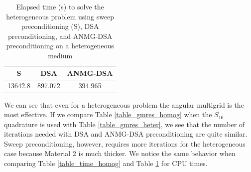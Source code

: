 \begin{table}[H]
  \begin{center}
    \caption{Elapsed time (s) to solve the heterogeneous problem using sweep
    preconditioning (S), DSA preconditioning, and ANMG-DSA preconditioning on
    a heterogeneous medium}
    \begin{tabular}{|c|c|c|}
      \hline
      S & DSA & ANMG-DSA \\
      \hline
      13642.8 & 897.072& 394.965 \\
      \hline
    \end{tabular}
    \label{table_time_heter}
  \end{center}
\end{table}
We can see that even for a heterogeneous problem the angular multigrid is the
most effective. If we compare Table \ref{table_gmres_homog} when the 
  $S_{16}$ quadrature is used with Table \ref{table_gmres_heter}, we see that
the number of iterations needed with DSA and ANMG-DSA preconditioning are
quite similar. Sweep preconditioning, however, requires more iterations for 
the heterogeneous case because Material 2 is much thicker. We notice the same
behavior when comparing Table \ref{table_time_homog} and Table
\ref{table_time_heter} for CPU times.

